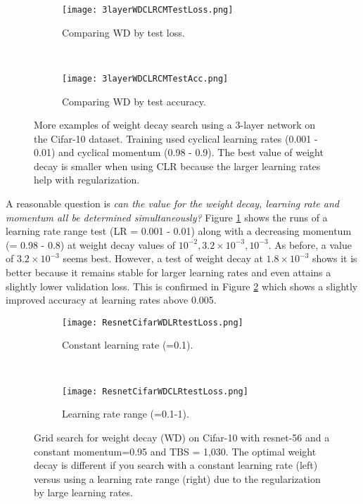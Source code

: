 \documentclass{article} %
\begin{document}
\begin{figure}[tbh]
	\centering
	\begin{subfigure}[b]{0.5\textwidth}
		\texttt{[image: 3layerWDCLRCMTestLoss.png]}
		\caption{Comparing WD by test loss.}
		\label{fig:3layerWDCLRCMTestLoss}       %
	\end{subfigure}
	\quad
	\hfill
	~ %
	\centering
	\begin{subfigure}[b]{0.43\textwidth}
		\texttt{[image: 3layerWDCLRCMTestAcc.png]}
		\caption{Comparing WD by test accuracy.}
		\label{fig:3layerWDCLRCMTestAcc}       %
	\end{subfigure}
	\caption{More examples of weight decay search using a 3-layer network on the Cifar-10 dataset. Training used cyclical learning rates (0.001 - 0.01) and cyclical momentum (0.98 - 0.9). The best value of weight decay is smaller when using CLR because the larger learning rates help with regularization.}
	\label{fig:3layerWD2}
	\vspace{-5pt}	
\end{figure}

A reasonable question is \emph{can the value for the weight decay, learning rate and momentum all be determined simultaneously?} Figure \ref{fig:3layerWDCLRCMTestLoss} shows the runs of a learning rate range test (LR = 0.001 - 0.01) along with a decreasing momentum (= 0.98 - 0.8) at weight decay values of $ 10^{-2}, 3.2 \times  10^{-3}, 10^{-3}$.  As before, a value of $3.2 \times  10^{-3}$ seems best.  However, a test of weight decay at $1.8 \times  10^{-3}$ shows it is better  because it remains stable for larger learning rates and even attains a slightly lower validation loss.  This is confirmed in Figure \ref{fig:3layerWDCLRCMTestAcc} which shows a slightly improved accuracy at learning rates above 0.005.


\begin{figure}[tbh]
	\centering
	\begin{subfigure}[b]{0.5\textwidth}
		\texttt{[image: ResnetCifarWDLRtestLoss.png]}
		\caption{Constant learning rate (=0.1).}
		\label{fig:ResnetCifarWDLRtestLoss}       %
	\end{subfigure}
	\quad
	\hfill
	~ %
	\centering
	\begin{subfigure}[b]{0.43\textwidth}
		\texttt{[image: ResnetCifarWDCLRtestLoss.png]}
		\caption{Learning rate range (=0.1-1).}
		\label{fig:ResnetCifarWDCLRtestLoss}       %
	\end{subfigure}
	\caption{Grid search for weight decay (WD) on Cifar-10 with resnet-56 and a  constant momentum=0.95 and TBS = 1,030. The optimal weight decay is different if you search with a constant learning rate (left) versus using a learning rate range (right) due to the regularization by large learning rates. }
	\label{fig:ResnetCifarWD}
	\vspace{-5pt}	
\end{figure}
\end{document}
